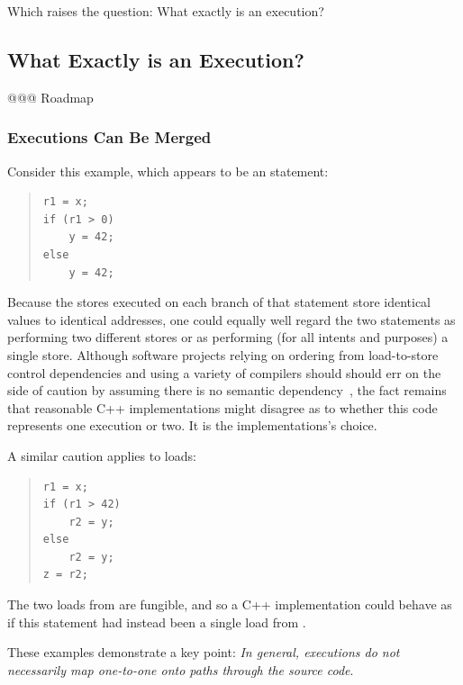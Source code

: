 \documentclass[10]{article}
\begin{document}
Which raises the question:
What exactly is an execution?

\subsection{What Exactly is an Execution?}
\label{sec:What Exactly is an Execution?}

@@@ Roadmap

\subsubsection{Executions Can Be Merged}
\label{sec:Executions Can Be Merged}

Consider this example, which appears to be an  statement:

\begin{quote}
\begin{verbatim}
r1 = x;
if (r1 > 0)
    y = 42;
else
    y = 42;
\end{verbatim}
\end{quote}

Because the stores executed on each branch of that  statement store
identical values to identical addresses, one could equally well regard
the two statements as performing two different stores or as performing
(for all intents and purposes) a single store.
Although software projects relying on ordering from load-to-store control
dependencies and using a variety of compilers should should err on the
side of caution by assuming there is no semantic
dependency~\cite{Howells2009membartxt},
the fact remains that reasonable C++ implementations might disagree as
to whether this code represents one execution or two.
It is the implementations's choice.

A similar caution applies to loads:

\begin{quote}
\begin{verbatim}
r1 = x;
if (r1 > 42)
    r2 = y;
else
    r2 = y;
z = r2;
\end{verbatim}
\end{quote}

The two loads from  are fungible, and so a C++ implementation
could behave as if this  statement had instead been a single load
from .

These examples demonstrate a key point: 
\emph{In general, executions do not necessarily map one-to-one onto
paths through the source code}.%
\end{document}
